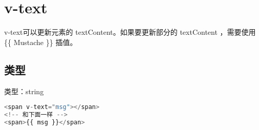 \begin{lstlisting}[language=JavaScript]

\end{lstlisting}




\begin{lstlisting}[language=JavaScript]

\end{lstlisting}




\begin{lstlisting}[language=JavaScript]

\end{lstlisting}




\begin{lstlisting}[language=JavaScript]

\end{lstlisting}

\chapter{v-text}


v-text可以更新元素的 textContent。如果要更新部分的 textContent ，需要使用 \{\{ Mustache \}\} 插值。

\section{类型}

\begin{compactitem}
\item 类型：string
\end{compactitem}


\begin{lstlisting}[language=JavaScript]
<span v-text="msg"></span>
<!-- 和下面一样 -->
<span>{{ msg }}</span>
\end{lstlisting}



\begin{lstlisting}[language=JavaScript]

\end{lstlisting}




\begin{lstlisting}[language=JavaScript]

\end{lstlisting}




